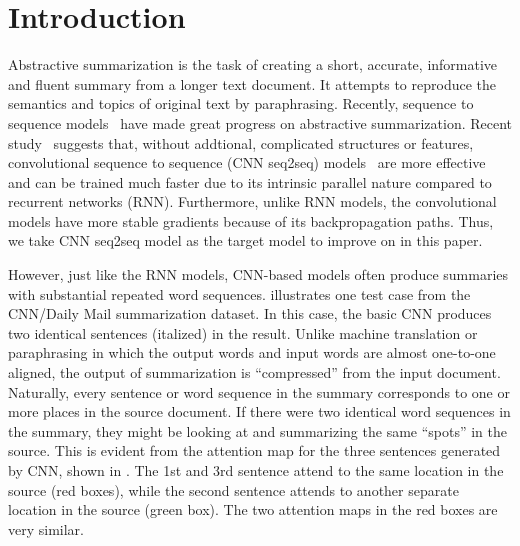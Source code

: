 \section{Introduction}
\label{sec:intro}

Abstractive summarization is the task of creating a short, accurate,
informative and fluent summary from a longer text document.
It attempts to reproduce the semantics and topics of original text
by paraphrasing. 
Recently, sequence to sequence
models~\cite{RushCW15,ChopraAR16,NallapatiZSGX16,SeeLM17,PaulusXS17}
have made great progress on abstractive summarization.
Recent study~\cite{bai2018empirical} suggests that, 
without addtional, complicated structures or features,
convolutional sequence to sequence 
(CNN seq2seq) models~\cite{gehring2017convs2s,FanGA18,LiuLZ18} 
are more effective and can be trained much faster due to 
its intrinsic parallel nature compared to recurrent networks (RNN).
Furthermore, unlike RNN models, 
the convolutional models have more stable gradients 
because of its backpropagation paths. 
Thus, we take CNN seq2seq model as the target model to improve on
in this paper.

However, just like the RNN models, CNN-based models often produce
summaries with substantial repeated word sequences.
 illustrates one 
test case from the CNN/Daily Mail summarization dataset. 
In this case, the basic CNN produces two 
identical sentences (italized) in the result. 
Unlike machine translation or paraphrasing in which the output words
and input words are almost one-to-one aligned, the output of summarization
is ``compressed'' from the input document. Naturally, every sentence or 
word sequence in the summary corresponds to one or more places in the source
document. If there were two identical word sequences in the summary,
they might be looking at and summarizing the same ``spots'' in the source.
This is evident from the attention map for the three sentences generated by 
CNN, shown in . The 1st and 3rd sentence attend to
the same location in the source (red boxes), while the second
sentence attends to another separate location in the source (green box). 
The two attention maps in the red boxes are very similar.

